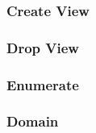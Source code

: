 \begin{multicols}{2}
        \subsubsection{Create View}
            
        \subsubsection{Drop View}
            
        \subsubsection{Enumerate}
            
        \subsubsection{Domain}
            
    \end{multicols}